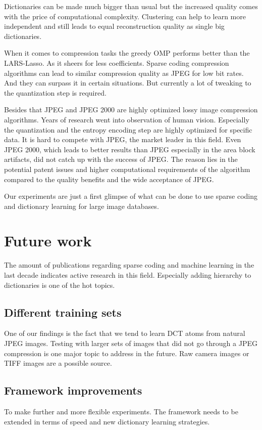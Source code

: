 Dictionaries can be made much bigger than usual but the increased quality
comes with the price of computational complexity. Clustering can help to learn
more independent and still leads to equal reconstruction quality as single big
dictionaries.

When it comes to compression tasks the greedy OMP performs better
than the LARS-Lasso. As it sheers for less coefficients. Sparse coding 
compression algorithms can lead to similar compression quality as JPEG 
for low bit rates. And they can surpass it in certain situations. But
currently a lot of tweaking to the quantization step is required. 

Besides that JPEG and JPEG 2000 are highly optimized lossy image compression
algorithms. Years of research went into observation of human vision. Especially
the quantization and the entropy encoding step are highly optimized for specific
data. It is hard to compete with JPEG, the market leader in this field.  Even
JPEG 2000, which leads to better results than JPEG especially in the area block
artifacts, did not catch up with the success of JPEG. The reason lies in the
potential patent issues and higher computational requirements of the algorithm
compared to the quality benefits and the wide acceptance of JPEG.

Our experiments are just a first glimpse of what can be done to use sparse
coding and dictionary learning for large image databases.

\section{Future work}
The amount of publications regarding sparse coding and machine learning in the
last decade indicates active research in this field. Especially
adding hierarchy to dictionaries is one of the hot topics. 

\subsection{Different training sets}
One of our findings is the fact that we tend to learn DCT atoms from natural
JPEG images. Testing with larger sets of images that did not go through a JPEG
compression is one major topic to address in the future. Raw camera images or
TIFF images are a possible source. 

\subsection{Framework improvements}
To make further and more flexible experiments. The framework needs to be
extended in terms of speed and new dictionary learning strategies.

